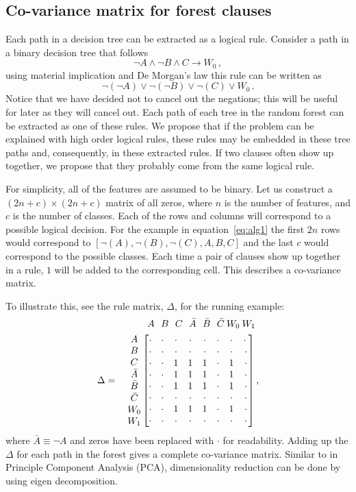 \documentclass[10pt]{article}
\begin{document}
\subsection{Co-variance matrix for forest clauses}
Each path in a decision tree can be extracted as a logical rule. Consider a path in a binary decision tree that follows 
\[\neg A \land \neg B \land C \rightarrow W_0 \,,\]
using material implication and De Morgan's law this rule can be written as 
\begin{equation}
\neg(\neg A) \lor \neg (\neg B) \lor \neg(C) \lor W_0 \, .
\label{eq:alg1}
\end{equation}
Notice that we have decided not to cancel out the negations; this will be useful for later as they will cancel out. Each path of each tree in the random forest can be extracted as one of these rules. We propose that if the problem can be explained with high order logical rules, these rules may be embedded in these tree paths and, consequently, in these extracted rules. If two clauses often show up together, we propose that they probably come from the same logical rule.  

For simplicity, all of the features are assumed to be binary. Let us construct a $(2n +c) \times (2n+c)$ matrix of all zeros, where $n$ is the number of features, and $c$ is the number of classes. Each of the rows and columns will correspond to a possible logical decision. For the example in equation~\ref{eq:alg1} the first $2n$ rows would correspond to $[\neg(A), \neg(B), \neg(C), A, B, C]$ and the last $c$ would correspond to the possible classes. Each time a pair of clauses show up together in a rule, $1$ will be added to the corresponding cell. This describes a co-variance matrix.

To illustrate this, see the rule matrix, $\Delta$, for the running example:
\begin{align*}
&\;\:A\:\:\:B\:\:\:C\:\:\:\bar{A}\:\:\:\bar{B}\:\:\:\bar{C}\:W_0\:W_1\\
\Delta = \quad \mqty{A\\B\\C\\\bar{A}\\\bar{B}\\\bar{C}\\W_0\\W_1}\, &\mqty[\cdot&\cdot&\cdot&\cdot&\cdot&\cdot&\cdot&\cdot\:\\\cdot&\cdot&\cdot&\cdot&\cdot&\cdot&\cdot&\cdot\\\cdot&\cdot&1&1&1&\cdot&1&\cdot\\\cdot&\cdot&1&1&1&\cdot&1&\cdot\\\cdot&\cdot&1&1&1&\cdot&1&\cdot\\\cdot&\cdot&\cdot&\cdot&\cdot&\cdot&\cdot&\cdot\\\cdot&\cdot&1&1&1&\cdot&1&\cdot\\\cdot&\cdot&\cdot&\cdot&\cdot&\cdot&\cdot&\cdot] \, ,
\end{align*}
where $\bar{A} \equiv \neg A$ and zeros have been replaced with $\cdot$ for readability. Adding up the $\Delta$ for each path in the forest gives a complete co-variance matrix. Similar to in Principle Component Analysis (PCA), dimensionality reduction can be done by using eigen decomposition.
\end{document}
